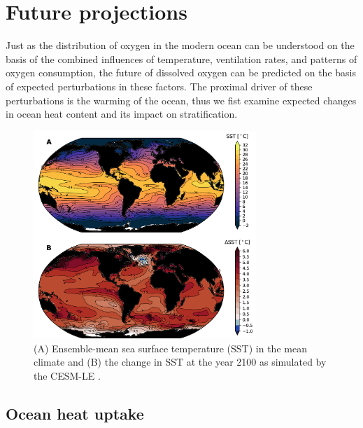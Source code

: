\documentclass{report_chapter}
\begin{document}
\section{Future projections}

Just as the distribution of oxygen in the modern ocean can be understood on the basis of the combined influences of temperature, ventilation rates, and patterns of oxygen consumption, the future of dissolved oxygen can be predicted on the basis of expected perturbations in these factors.
The proximal driver of these perturbations is the warming of the ocean, thus we fist examine expected changes in ocean heat content and its impact on stratification.

\begin{figure}[tb]
\centering
\includegraphics[width=0.75\textwidth]{cesm-sst.png}
\caption{(A) Ensemble-mean sea surface temperature (SST) in the mean climate and (B) the change in SST at the year 2100 as simulated by the CESM-LE \protect\citep{Kay-Deser-etal-2015}.}
\label{fig:cesm-temp-change}
\end{figure}

\subsection{Ocean heat uptake}\label{loc:heat-uptake}
\end{document}
